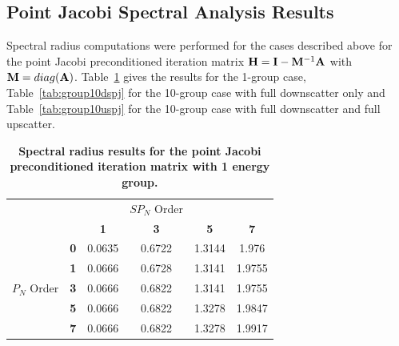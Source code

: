 \subsection{Point Jacobi Spectral Analysis Results}
\label{subsec:spn_analysis_results}
Spectral radius computations were performed for the cases described
above for the point Jacobi preconditioned iteration matrix $\mathbf{H} =
\mathbf{I}-\mathbf{M}^{-1}\mathbf{A}$ with $\mathbf{M} =
diag(\mathbf{A})$. Table~\ref{tab:group1pj} gives the results for the
1-group case, Table~\ref{tab:group10dspj} for the 10-group case with
full downscatter only and Table~\ref{tab:group10uspj} for the 10-group
case with full downscatter and full upscatter.
\begin{table}[t!]
  \begin{center}
    \begin{tabular}{cccccc}\hline\hline
      \multicolumn{1}{c}{}& 
      \multicolumn{1}{c}{}& 
      \multicolumn{1}{c}{}& 
      \multicolumn{1}{c}{$SP_N$ Order}& 
      \multicolumn{1}{c}{}& 
      \multicolumn{1}{c}{} \\
       &   & \textbf{1} & \textbf{3} & \textbf{5} & \textbf{7}  \\
       & \textbf{0} & 0.0635 & 0.6722 & 1.3144 & 1.976 \\
       & \textbf{1} & 0.0666 & 0.6728 & 1.3141 & 1.9755 \\
      $P_N$ Order & \textbf{3} & 0.0666 & 0.6822 & 1.3141 & 1.9755 \\
       & \textbf{5} & 0.0666 & 0.6822 & 1.3278 & 1.9847 \\
       & \textbf{7} & 0.0666 & 0.6822 & 1.3278 & 1.9917 \\
      \hline\hline
    \end{tabular}
  \end{center}
  \caption{\textbf{Spectral radius results for the point Jacobi
      preconditioned iteration matrix with 1 energy group.}}
  \label{tab:group1pj}
\end{table}
